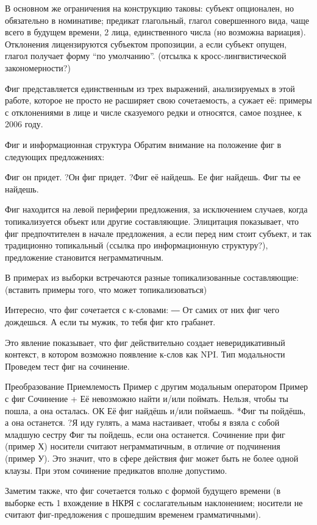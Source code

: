 \documentclass{article}
\begin{document}
В основном же ограничения на конструкцию таковы: субъект опционален, но обязательно в номинативе; предикат глагольный, глагол совершенного вида, чаще всего в будущем времени, 2 лица, единственного числа (но возможна вариация). Отклонения лицензируются субъектом пропозиции, а если субъект опущен, глагол получает форму “по умолчанию”. (отсылка к кросс-лингвистической закономерности?)

Фиг представляется единственным из трех выражений, анализируемых в этой работе, которое не просто не расширяет свою сочетаемость, а сужает её: примеры с отклонениями в лице и числе сказуемого редки и относятся, самое позднее, к 2006 году.

Фиг и информационная структура
Обратим внимание на положение фиг в следующих предложениях:

Фиг он придет.
?Он фиг придет.
?Фиг её найдешь.
Ее фиг найдешь.
Фиг ты ее найдешь.

Фиг находится на левой периферии предложения, за исключением случаев, когда топикализуется объект или другие составляющие. Элицитация показывает, что фиг предпочтителен в начале предложения, а если перед ним стоит субъект, и так традиционно топикальный (ссылка про информационную структуру?), предложение становится неграмматичным.

В примерах из выборки встречаются разные топикализованные составляющие:
(вставить примеры того, что может топикализоваться)

Интересно, что фиг сочетается с к-словами:
― От самих от них фиг чего дождешься.
А если ты мужик, то тебя фиг кто грабанет.

Это явление показывает, что фиг действительно создает неверидикативный контекст, в котором возможно появление к-слов как NPI.
Тип модальности 
Проведем тест фиг на сочинение.

Преобразование
Приемлемость
Пример с другим модальным оператором
Пример с фиг
Сочинение
+
Её невозможно найти и/или поймать.
Нельзя, чтобы ты пошла, а она осталась.
ОК Её фиг найдёшь и/или поймаешь.
*Фиг ты пойдёшь, а она останется.
?{Я иду гулять, а мама настаивает, чтобы я взяла с собой младшую сестру} Фиг ты пойдешь, если она останется.
Сочинение при фиг (пример Х) носители считают неграмматичным, в отличие от подчинения (пример У). Это значит, что в сфере действия фиг может быть не более одной клаузы. При этом сочинение предикатов вполне допустимо.

Заметим также, что фиг сочетается только с формой будущего времени (в выборке есть 1 вхождение в НКРЯ с сослагательным наклонением; носители не считают фиг-предложения с прошедшим временем грамматичными).
\end{document}
